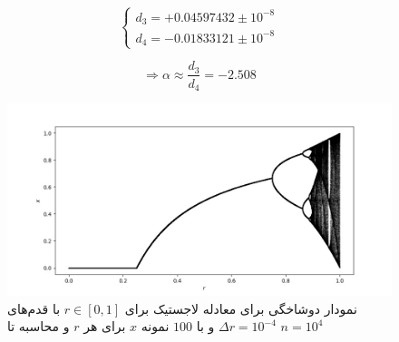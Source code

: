 \documentclass[11pt, a4paper]{article}
\begin{document}
\begin{equation}
  \begin{cases}
    d_3 = +0.04597432 \pm 10^{-8}\\
    d_4 = -0.01833121 \pm 10^{-8}
  \end{cases}
\end{equation}

\begin{equation}
  \Rightarrow
  \alpha \approx \frac{d_3}{d_4} = -2.508
\end{equation}



\begin{figure}
  \centering
  \includegraphics[width=.9\textwidth]{q4_0_1_10000_100_10000.jpg}
  \caption{نمودار دوشاخگی برای معادله لاجستیک برای $r \in [0, 1]$ با قدم‌های $\Delta r = 10^{-4}$ و با $100$ نمونه $x$ برای هر $r$ و محاسبه تا $n = 10^4$}
  \label{fig:q4_bifurcation_0_1}
\end{figure}
\end{document}
